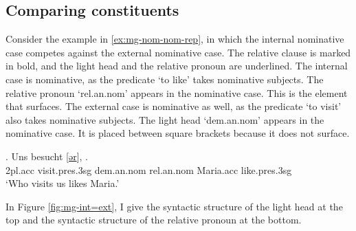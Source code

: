 \subsection{Comparing constituents}

Consider the example in \ref{ex:mg-nom-nom-rep}, in which the internal nominative case competes against the external nominative case. The relative clause is marked in bold, and the light head and the relative pronoun are underlined.
The internal case is nominative, as the predicate  `to like' takes nominative subjects. The relative pronoun  `\ac{rel}.\ac{an}.\ac{nom}' appears in the nominative case. This is the element that surfaces.
The external case is nominative as well, as the predicate  `to visit' also takes nominative subjects. The light head  `\ac{dem}.\ac{an}.\ac{nom}' appears in the nominative case. It is placed between square brackets because it does not surface.

\exg. Uns besucht [\underline{ər}], \underline{}  .\\
 2\ac{pl}.\ac{acc} visit.\ac{pres}.3\ac{sg}\scsub{[nom]} \ac{dem}.\ac{an}.\ac{nom} \ac{rel}.\ac{an}.\ac{nom} Maria.\ac{acc} like.\ac{pres}.3\ac{sg}\scsub{[nom]}\\
 `Who visits us likes Maria.' \label{ex:mg-nom-nom-rep}

In Figure \ref{fig:mg-int=ext}, I give the syntactic structure of the light head at the top and the syntactic structure of the relative pronoun at the bottom.

